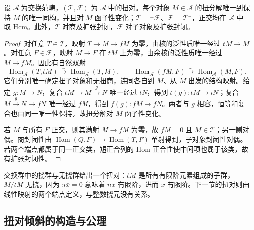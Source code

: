 \begin{proposition}\label{b4:prop:torsion-pair-properties}
	设 \(\mathcal A\) 为交换范畴，\((\mathcal T,\mathcal F)\) 为 \(\mathcal A\) 中的扭对。每个对象 \(M\in\mathcal A\) 的扭分解唯一到保持 \(M\) 的唯一同构，并且对 \(M\) 函子性变化；\(\mathcal T={}^\perp\mathcal F\)、\(\mathcal F=\mathcal T^\perp\)，正交均在 \(\mathcal A\) 中取 Hom。此外，\(\mathcal T\) 对商及扩张封闭，\(\mathcal F\) 对子对象及扩张封闭。
\end{proposition}
\begin{proof}
	对任意 \(T\in\mathcal T\)，映射 \(T\to M\to fM\) 为零，由核的泛性质唯一经过 \(tM\to M\)。对任意 \(F\in\mathcal F\)，映射 \(M\to F\) 在 \(tM\) 上为零，由余核的泛性质唯一经过 \(M\to fM\)。因此有自然双射
	\[
		\operatorname{Hom}_{\mathcal A}(T,tM)\xrightarrow{\sim}\operatorname{Hom}_{\mathcal A}(T,M), \qquad \operatorname{Hom}_{\mathcal A}(fM,F)\xrightarrow{\sim}\operatorname{Hom}_{\mathcal A}(M,F).
	\]
	它们分别唯一确定扭子对象和无扭商，连同各自到 \(M\)、从 \(M\) 出发的结构映射。给定 \(g:M\to N\)，复合 \(tM\to M\xrightarrow{g}N\) 唯一经过 \(tN\)，得到 \(t(g):tM\to tN\)；复合 \(M\xrightarrow{g}N\to fN\) 唯一经过 \(fM\)，得到 \(f(g):fM\to fN\)。两者与 \(g\) 相容，恒等和复合也由同一唯一性保持，故扭分解对 \(M\) 函子性变化。

	若 \(M\) 与所有 \(F\) 正交，则其满射 \(M\to fM\) 为零，故 \(fM=0\) 且 \(M\in\mathcal T\)；另一侧对偶。商封闭性由 \(\operatorname{Hom}(Q,F)\to\operatorname{Hom}(T,F)\) 单射得到，子对象封闭性对偶。若两个端点都属于同一正交类，短正合列的 Hom 正合性使中间项也属于该类，故有扩张封闭性。
\end{proof}

交换群中的挠群与无挠群给出一个扭对：\(tM\) 是所有有限阶元素组成的子群，\(M/tM\) 无挠，因为 \(n\bar x=0\) 意味着 \(nx\) 有限阶，进而 \(x\) 有限阶。下一节的扭对则由线性映射的两个端点定义，与整数挠元没有关系。

\subsection{扭对倾斜的构造与公理}
\label{b4:subsec:1904:02}

